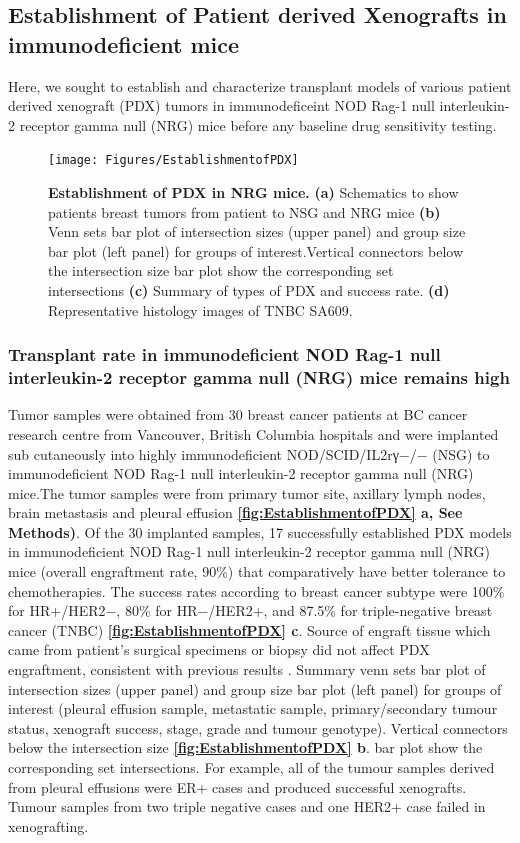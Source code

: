 \subsection{Establishment of Patient derived Xenografts in immunodeficient mice}

Here, we sought to establish and characterize transplant models of various patient derived xenograft (PDX) tumors in immunodeficeint NOD Rag-1 null interleukin-2 receptor gamma null (NRG) mice before any baseline drug sensitivity testing.

\begin{figure}
	\centering
	\texttt{[image: Figures/EstablishmentofPDX]}
	\caption[Establishment of PDX in NRG mice]
	{\small
	    \textbf{Establishment of PDX in NRG mice.}
	    \textbf{(a)} Schematics to show patients breast tumors from patient to NSG and NRG mice 
	    \textbf{(b)} Venn sets bar plot of intersection sizes (upper panel) and group size bar plot  (left panel) for groups of interest.Vertical connectors below the intersection size
bar plot show the corresponding set intersections
	    \textbf{(c)} Summary of types of PDX and success rate.
	     \textbf{(d)} Representative histology images of TNBC SA609. 
	}
	\label{fig:EstablishmentofPDX}
\end{figure}

\subsubsection{Transplant rate in immunodeficient NOD Rag-1 null interleukin-2 receptor gamma null (NRG) mice  remains high}
Tumor samples were obtained from 30 breast cancer patients at BC cancer research centre from Vancouver, British Columbia hospitals and were implanted sub cutaneously into highly immunodeficient NOD/SCID/IL2rγ−/− (NSG) to immunodeficient NOD Rag-1 null interleukin-2 receptor gamma null (NRG) mice.The tumor samples were from primary tumor site, axillary lymph nodes, brain metastasis and pleural effusion \textbf{\autoref{fig:EstablishmentofPDX} a,  See Methods)}.
Of the 30 implanted samples, 17 successfully established PDX models in immunodeficient NOD Rag-1 null interleukin-2 receptor gamma null (NRG) mice (overall engraftment rate, 90\%) that comparatively have better tolerance to chemotherapies. The success rates according to breast cancer subtype were 100\% for HR+/HER2−, 80\% for HR−/HER2+, and 87.5\% for triple-negative breast cancer (TNBC) \textbf{\autoref{fig:EstablishmentofPDX} c}. Source of engraft tissue which came from patient's surgical specimens or biopsy did not affect PDX engraftment, consistent with previous results \cite{ryu2019integrative}. Summary venn sets bar plot of intersection sizes (upper panel) and group size bar plot  (left panel) for groups of interest (pleural effusion sample, metastatic sample, primary/secondary tumour status, xenograft success, stage, grade and tumour genotype). Vertical connectors below the intersection size \textbf{\autoref{fig:EstablishmentofPDX} b}.
bar plot show the corresponding set intersections. For example, all of the tumour samples derived from pleural effusions were ER+ cases and produced successful xenografts. Tumour samples from two triple negative cases and one HER2+ case failed in xenografting.


